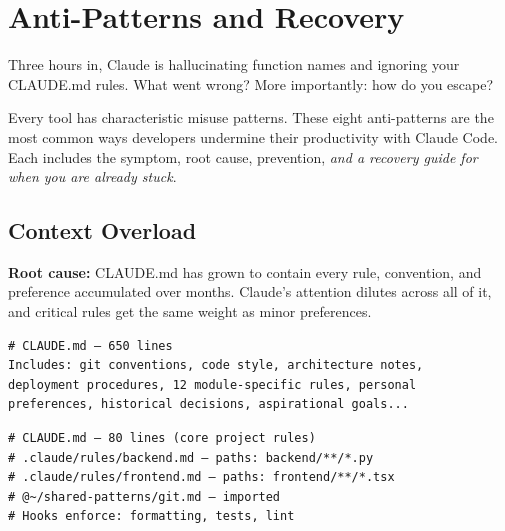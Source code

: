 \chapter{Anti-Patterns and Recovery}
\label{ch:antipatterns}

\begin{itshape}
Three hours in, Claude is hallucinating function names and ignoring
your CLAUDE.md rules. What went wrong? More importantly: how do you escape?
\end{itshape}

Every tool has characteristic misuse patterns.
These eight anti-patterns are the most common ways developers
undermine their productivity with Claude Code.
Each includes the symptom, root cause, prevention,
\emph{and a recovery guide for when you are already stuck}.

\section{Context Overload}


\textbf{Root cause:} CLAUDE.md has grown to contain every rule, convention,
and preference accumulated over months. Claude's attention dilutes
across all of it, and critical rules get the same weight as minor preferences.

\begin{fullwidth}
\begin{beforeafter}
\before
\begin{verbatim}
# CLAUDE.md — 650 lines
Includes: git conventions, code style, architecture notes,
deployment procedures, 12 module-specific rules, personal
preferences, historical decisions, aspirational goals...
\end{verbatim}

\after
\begin{verbatim}
# CLAUDE.md — 80 lines (core project rules)
# .claude/rules/backend.md — paths: backend/**/*.py
# .claude/rules/frontend.md — paths: frontend/**/*.tsx
# @~/shared-patterns/git.md — imported
# Hooks enforce: formatting, tests, lint
\end{verbatim}
\end{beforeafter}
\end{fullwidth}

